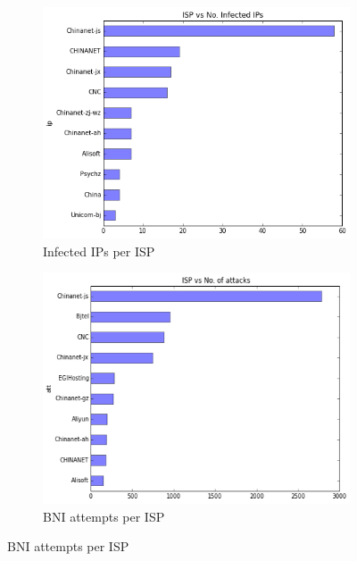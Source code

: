 \begin{figure}[ht]
\caption{ISP analysis}
\label{fig:isp}
    \begin{subfigure}[ht]{0.5\linewidth}
        \caption{Infected IPs per ISP}
        \label{fig:isp_ip}
    \centering
    \includegraphics[width=\linewidth]{images/isp_no_ip}
    \end{subfigure}
\quad
    \begin{subfigure}[ht]{0.5\textwidth}
    \caption{BNI attempts per ISP}
    \label{fig:isp_att}
    \centering
    \includegraphics[width=\linewidth]{images/isp_no_att}
    \end{subfigure}

\end{figure}
